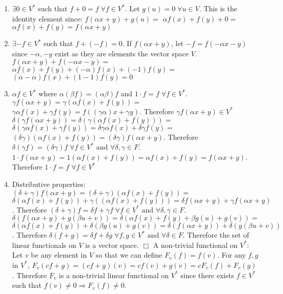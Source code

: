 \documentclass[12pt,letterpaper,reqno]{amsart}
\begin{document}
\begin{enumerate}[1.]
\begin{flushleft}
\begin{enumerate}
        \item $\exists 0 \in V^*$ such that $f + 0 = f \; \forall f \in V^*$. Let $g(u) = 0 \; \forall u \in V$. This is the identity element since: $f(\alpha x + y) + g(u) = $ $\alpha f(x) + f(y) + 0 =$ $\alpha f(x) + f(y) = f(\alpha x + y)$
        \item $\exists -f \in V^*$ such that $f + (-f) = 0$. If $f(\alpha x + y)$, let $-f = f(-\alpha x - y)$ since $-\alpha, -y$ exist as they are elements the vector space $V$. $f(\alpha x + y) + f(-\alpha x - y) =$ $\alpha f(x) + f(y) + (-\alpha)f(x) + (-1)f(y) =$ $(\alpha - \alpha)f(x) + (1-1)f(y) = 0$
        \item $\alpha f \in V^*$ where $\alpha(\beta f) = (\alpha\beta)f$ and $1\cdot f = f \; \forall f \in V^*$. $\gamma f(\alpha x + y) = \gamma(\alpha f(x) + f(y)) =$ $\gamma \alpha f(x) + \gamma f(y) = f((\gamma\alpha)x + \gamma y)$. Therefore $\gamma f(\alpha x + y) \in V^*$ $\delta(\gamma f(\alpha x + y)) = \delta(\gamma(\alpha f(x) + f(y))) =$ $\delta(\gamma \alpha f(x) + \gamma f(y)) = \delta\gamma\alpha f(x) + \delta\gamma f(y) =$ $(\delta\gamma)(\alpha f(x) + f(y)) = (\delta\gamma)f(\alpha x + y)$. Therefore $\delta(\gamma f) = (\delta\gamma)f \; \forall f \in V^* \text{ and } \forall \delta, \gamma \in F$. $1\cdot f(\alpha x + y) = 1 (\alpha f(x) + f(y)) = \alpha f(x) + f(y) = f(\alpha x + y)$. Therefore $1\cdot f = f \; \forall f \in V^*$
        \item Distributive properties: $(\delta + \gamma)f(\alpha x + y) = (\delta + \gamma)(\alpha f(x) + f(y)) =$ $\delta(\alpha f(x) + f(y)) + \gamma((\alpha f(x) + f(y))) = \delta f(\alpha x + y) + \gamma f(\alpha x + y)$. Therefore $(\delta + \gamma)f = \delta f + \gamma f \; \forall f \in V^* \text{ and } \forall \delta, \gamma \in F$. $\delta(f(\alpha x + y) + g(\beta u + v)) = \delta (\alpha f(x) + f(y) + \beta g(u) + g(v)) =$ $\delta(\alpha f(x) + f(y)) + \delta(\beta g(u) + g(v)) = \delta(f(\alpha x + y)) + \delta(g(\beta u + v))$. Therefore $\delta(f+g) = \delta f + \delta g \; \forall f,g \in V^* \text{ and } \forall \delta \in F$. Therefore the set of linear functionals on $V$ is a vector space. $\Box$ \newline
        A non-trivial functional on $V^*$: Let $v$ be any element in $V$ so that we can define $F_v(f) = f(v)$. For any $f,g$ in $V^*$, $F_v(cf+g) = (cf+g)(v) = cf(v) + g(v) = cF_v(f) + F_v(g)$. Therefore $F_v$ is a non-trivial linear functional on $V^*$ since there exists $f \in V^*$ such that $f(v) \not= 0 \Rightarrow F_v(f) \not= 0$.
    \end{enumerate}

\end{flushleft}
\end{enumerate}
\end{document}
